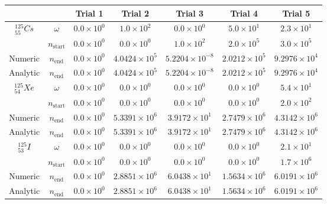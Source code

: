 \begin{table}[h]
\begin{center}
\begin{longtable}{c c c c c c c}
\hline\hline
 &  & Trial 1 & Trial 2 & Trial 3 & Trial 4 & Trial 5 \\
\hline\hline
${}^{125}_{55}Cs$ & $\omega$ & 
${0.0} \times 10^{0}$ & ${1.0} \times 10^{2}$ & ${0.0} \times 10^{0}$ &
${5.0} \times 10^{1}$ & ${2.3} \times 10^{1}$ \\
 & $n_{\text{start}}$ & 
${0.0} \times 10^{0}$ & ${0.0} \times 10^{0}$ & ${1.0} \times 10^{2}$ & 
${2.0} \times 10^{5}$ & ${3.0} \times 10^{5}$ \\
Numeric & $n_{\text{end}}$ & 
${0.0} \times 10^{0}$ & ${4.0424} \times 10^{5}$ & ${5.2204} \times 10^{-8}$ & 
${2.0212} \times 10^{5}$ & ${9.2976} \times 10^{4}$ \\
Analytic & $n_{\text{end}}$ & 
${0.0} \times 10^{0}$ & ${4.0424} \times 10^{5}$ & ${5.2204} \times 10^{-8}$ & 
${2.0212} \times 10^{5}$ & ${9.2976} \times 10^{4}$ \\
\hline
${}^{125}_{54}Xe$ & $\omega$ & 
${0.0} \times 10^{0}$ & ${0.0} \times 10^{0}$ & ${0.0} \times 10^{0}$ &
${0.0} \times 10^{0}$ & ${5.4} \times 10^{1}$ \\
 & $n_{\text{start}}$ & 
${0.0} \times 10^{0}$ & ${0.0} \times 10^{0}$ & ${0.0} \times 10^{0}$ & 
${0.0} \times 10^{0}$ & ${2.0} \times 10^{2}$ \\
Numeric & $n_{\text{end}}$ & 
${0.0} \times 10^{0}$ & ${5.3391} \times 10^{6}$ & ${3.9172} \times 10^{1}$ & 
${2.7479} \times 10^{6}$ & ${4.3142} \times 10^{6}$ \\
Analytic & $n_{\text{end}}$ & 
${0.0} \times 10^{0}$ & ${5.3391} \times 10^{6}$ & ${3.9172} \times 10^{1}$ & 
${2.7479} \times 10^{6}$ & ${4.3142} \times 10^{6}$ \\
\hline$
{}^{125}_{53}I$ & $\omega$ & 
${0.0} \times 10^{0}$ & ${0.0} \times 10^{0}$ & ${0.0} \times 10^{0}$ &
${0.0} \times 10^{0}$ & ${2.1} \times 10^{1}$ \\
 & $n_{\text{start}}$ & 
${0.0} \times 10^{0}$ & ${0.0} \times 10^{0}$ & ${0.0} \times 10^{0}$ &
${0.0} \times 10^{0}$ & ${1.7} \times 10^{6}$ \\
Numeric & $n_{\text{end}}$ & 
${0.0} \times 10^{0}$ & ${2.8851} \times 10^{6}$ & ${6.0438} \times 10^{1}$ & 
${1.5634} \times 10^{6}$ & ${6.0191} \times 10^{6}$ \\
Analytic & $n_{\text{end}}$ & 
${0.0} \times 10^{0}$ & ${2.8851} \times 10^{6}$ & ${6.0438} \times 10^{1}$ & 
${1.5634} \times 10^{6}$ & ${6.0191} \times 10^{6}$ \\

\end{longtable}
\end{center}
\end{table}
